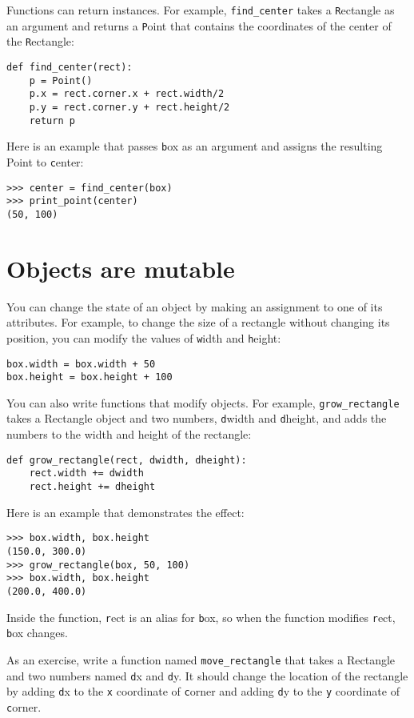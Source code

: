 \documentclass[
DIV=11,
fontsize=13,
twoside,
headinclude=false,
titlepage=firstiscover,
abstract=true,
headsepline=true,
footsepline=true,
chapterprefix=true, %
headings=big,
bibliography=totoc,%
captions=tableheading
]{scrbook}
\theoremstyle{definition}
\begin{document}
Functions can return instances.  For example, \verb"find_center"
takes a {\texttt Rectangle} as an argument and returns a {\texttt Point}
that contains the coordinates of the center of the {\texttt Rectangle}:

\begin{lstlisting}
def find_center(rect):
    p = Point()
    p.x = rect.corner.x + rect.width/2
    p.y = rect.corner.y + rect.height/2
    return p
\end{lstlisting}
%
Here is an example that passes {\texttt box} as an argument and assigns
the resulting Point to {\texttt center}:

\begin{lstlisting}
>>> center = find_center(box)
>>> print_point(center)
(50, 100)
\end{lstlisting}
%

\section{Objects are mutable}

You can change the state of an object by making an assignment to one of
its attributes.  For example, to change the size of a rectangle
without changing its position, you can modify the values of {\texttt
width} and {\texttt height}:

\begin{lstlisting}
box.width = box.width + 50
box.height = box.height + 100
\end{lstlisting}
%
You can also write functions that modify objects.  For example,
\verb"grow_rectangle" takes a Rectangle object and two numbers,
{\texttt dwidth} and {\texttt dheight}, and adds the numbers to the
width and height of the rectangle:

\begin{lstlisting}
def grow_rectangle(rect, dwidth, dheight):
    rect.width += dwidth
    rect.height += dheight
\end{lstlisting}
%
Here is an example that demonstrates the effect:

\begin{lstlisting}
>>> box.width, box.height
(150.0, 300.0)
>>> grow_rectangle(box, 50, 100)
>>> box.width, box.height
(200.0, 400.0)
\end{lstlisting}
%
Inside the function, {\texttt rect} is an
alias for {\texttt box}, so when the function modifies {\texttt rect}, 
{\texttt box} changes.

As an exercise, write a function named \verb"move_rectangle" that takes
a Rectangle and two numbers named {\texttt dx} and {\texttt dy}.  It
should change the location of the rectangle by adding {\texttt dx}
to the {\texttt x} coordinate of {\texttt corner} and adding {\texttt dy}
to the {\texttt y} coordinate of {\texttt corner}.
\end{document}

